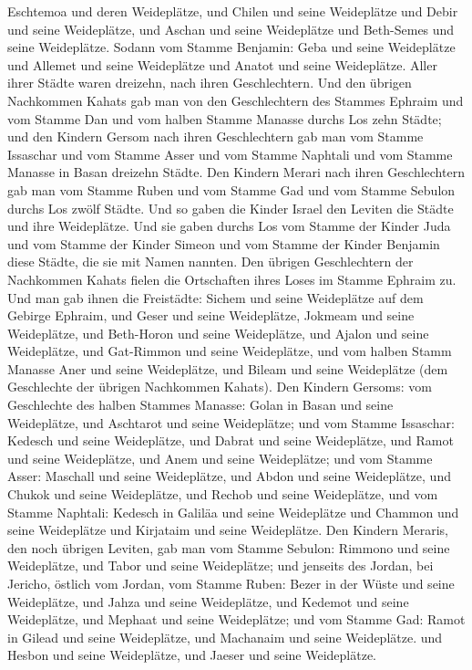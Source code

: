 Eschtemoa und deren Weideplätze, und Chilen und seine Weideplätze
 und Debir und seine Weideplätze,  und
Aschan und seine Weideplätze und Beth-Semes und seine Weideplätze.
 Sodann vom Stamme Benjamin: Geba und seine Weideplätze
und Allemet und seine Weideplätze und Anatot und seine Weideplätze.
Aller ihrer Städte waren dreizehn, nach ihren Geschlechtern.
 Und den übrigen Nachkommen Kahats gab man von den
Geschlechtern des Stammes Ephraim und vom Stamme Dan und vom halben
Stamme Manasse durchs Los zehn Städte;  und den Kindern
Gersom nach ihren Geschlechtern gab man vom Stamme Issaschar und vom
Stamme Asser und vom Stamme Naphtali und vom Stamme Manasse in Basan
dreizehn Städte.  Den Kindern Merari nach ihren
Geschlechtern gab man vom Stamme Ruben und vom Stamme Gad und vom Stamme
Sebulon durchs Los zwölf Städte.  Und so gaben die Kinder
Israel den Leviten die Städte und ihre Weideplätze.  Und
sie gaben durchs Los vom Stamme der Kinder Juda und vom Stamme der
Kinder Simeon und vom Stamme der Kinder Benjamin diese Städte, die sie
mit Namen nannten.  Den übrigen Geschlechtern der
Nachkommen Kahats fielen die Ortschaften ihres Loses im Stamme Ephraim
zu.  Und man gab ihnen die Freistädte: Sichem und seine
Weideplätze auf dem Gebirge Ephraim, und Geser und seine Weideplätze,
 Jokmeam und seine Weideplätze, und Beth-Horon und seine
Weideplätze,  und Ajalon und seine Weideplätze, und
Gat-Rimmon und seine Weideplätze,  und vom halben Stamm
Manasse Aner und seine Weideplätze, und Bileam und seine Weideplätze
(dem Geschlechte der übrigen Nachkommen Kahats).  Den
Kindern Gersoms: vom Geschlechte des halben Stammes Manasse: Golan in
Basan und seine Weideplätze, und Aschtarot und seine Weideplätze;
 und vom Stamme Issaschar: Kedesch und seine Weideplätze,
und Dabrat und seine Weideplätze,  und Ramot und seine
Weideplätze, und Anem und seine Weideplätze;  und vom
Stamme Asser: Maschall und seine Weideplätze, und Abdon und seine
Weideplätze,  und Chukok und seine Weideplätze, und
Rechob und seine Weideplätze,  und vom Stamme Naphtali:
Kedesch in Galiläa und seine Weideplätze und Chammon und seine
Weideplätze und Kirjataim und seine Weideplätze.  Den
Kindern Meraris, den noch übrigen Leviten, gab man vom Stamme Sebulon:
Rimmono und seine Weideplätze, und Tabor und seine Weideplätze;
 und jenseits des Jordan, bei Jericho, östlich vom
Jordan, vom Stamme Ruben: Bezer in der Wüste und seine Weideplätze, und
Jahza und seine Weideplätze,  und Kedemot und seine
Weideplätze, und Mephaat und seine Weideplätze;  und vom
Stamme Gad: Ramot in Gilead und seine Weideplätze, und Machanaim und
seine Weideplätze.  und Hesbon und seine Weideplätze, und
Jaeser und seine Weideplätze.

